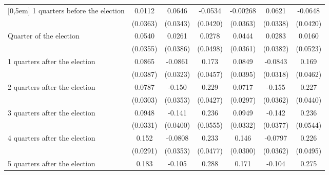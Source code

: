 \begin{table}[!ht]
\begin{tabular}{l*{6}{c}}
[0,5em]
 1 quarters before the election&      0.0112         &      0.0646         &     -0.0534         &    -0.00268         &      0.0621         &     -0.0648         \\
                    &    (0.0363)         &    (0.0343)         &    (0.0420)         &    (0.0363)         &    (0.0338)         &    (0.0420)         \\
[0,5em]
Quarter of the election&      0.0540         &      0.0261         &      0.0278         &      0.0444         &      0.0283         &      0.0160         \\
                    &    (0.0355)         &    (0.0386)         &    (0.0498)         &    (0.0361)         &    (0.0382)         &    (0.0523)         \\
[0,5em]
 1 quarters after the election&      0.0865\sym{*}  &     -0.0861\sym{**} &       0.173\sym{***}&      0.0849\sym{*}  &     -0.0843\sym{**} &       0.169\sym{***}\\
                    &    (0.0387)         &    (0.0323)         &    (0.0457)         &    (0.0395)         &    (0.0318)         &    (0.0462)         \\
[0,5em]
 2 quarters after the election&      0.0787\sym{**} &      -0.150\sym{***}&       0.229\sym{***}&      0.0717\sym{*}  &      -0.155\sym{***}&       0.227\sym{***}\\
                    &    (0.0303)         &    (0.0353)         &    (0.0427)         &    (0.0297)         &    (0.0362)         &    (0.0440)         \\
[0,5em]
 3 quarters after the election&      0.0948\sym{**} &      -0.141\sym{***}&       0.236\sym{***}&      0.0949\sym{**} &      -0.142\sym{***}&       0.236\sym{***}\\
                    &    (0.0331)         &    (0.0400)         &    (0.0555)         &    (0.0332)         &    (0.0377)         &    (0.0544)         \\
[0,5em]
 4 quarters after the election&       0.152\sym{***}&     -0.0808\sym{*}  &       0.233\sym{***}&       0.146\sym{***}&     -0.0797\sym{*}  &       0.226\sym{***}\\
                    &    (0.0291)         &    (0.0353)         &    (0.0477)         &    (0.0300)         &    (0.0362)         &    (0.0495)         \\
[0,5em]
 5 quarters after the election&       0.183\sym{***}&      -0.105\sym{**} &       0.288\sym{***}&       0.171\sym{***}&      -0.104\sym{**} &       0.275\sym{***}\\

\end{tabular}
\end{table}
